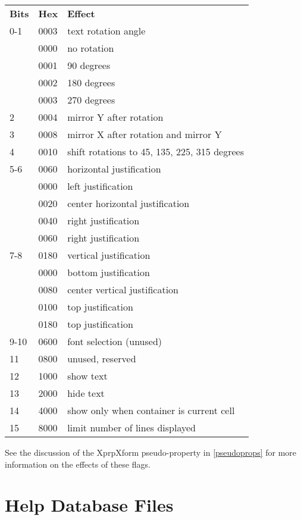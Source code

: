 \begin{tabular}{lll}\\
\bf Bits & \bf Hex & \bf Effect\\
0-1  & 0003 & text rotation angle\\
     & 0000 & no rotation\\
     & 0001 & 90 degrees\\
     & 0002 & 180 degrees\\
     & 0003 & 270 degrees\\
2    & 0004 & mirror Y after rotation\\
3    & 0008 & mirror X after rotation and mirror Y\\
4    & 0010 & shift rotations to 45, 135, 225, 315 degrees\\
5-6  & 0060 & horizontal justification\\
     & 0000 & left justification\\
     & 0020 & center horizontal justification\\
     & 0040 & right justification\\
     & 0060 & right justification\\
7-8  & 0180 & vertical justification\\
     & 0000 & bottom justification\\
     & 0080 & center vertical justification\\
     & 0100 & top justification\\
     & 0180 & top justification\\
9-10 & 0600 & font selection (unused)\\
11   & 0800 & unused, reserved\\
12   & 1000 & show text\\
13   & 2000 & hide text\\
14   & 4000 & show only when container is current cell\\
15   & 8000 & limit number of lines displayed\\
\end{tabular}

See the discussion of the {\vt XprpXform} pseudo-property in
\ref{pseudoprops} for more information on the effects of these flags.


\section{Help Database Files}
\label{helpfiles}

